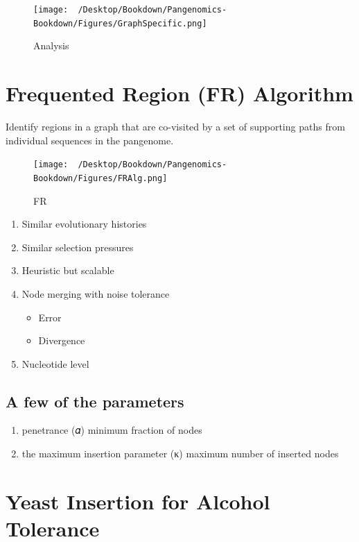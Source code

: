 \documentclass[
]{book}
\providecommand{\tightlist}{%
  \setlength{\itemsep}{0pt}\setlength{\parskip}{0pt}}
\begin{document}
\begin{figure}
\centering
\texttt{[image: ~/Desktop/Bookdown/Pangenomics-Bookdown/Figures/GraphSpecific.png]}
\caption{Analysis}
\end{figure}

\hypertarget{frequented-region-fr-algorithm}{%
\section{Frequented Region (FR) Algorithm}\label{frequented-region-fr-algorithm}}

Identify regions in a graph that are co-visited by a set of supporting
paths from individual sequences in the pangenome.

\begin{figure}
\centering
\texttt{[image: ~/Desktop/Bookdown/Pangenomics-Bookdown/Figures/FRAlg.png]}
\caption{FR}
\end{figure}

\begin{enumerate}
\def\labelenumi{\arabic{enumi}.}
\item
  Similar evolutionary histories
\item
  Similar selection pressures
\item
  Heuristic but scalable
\item
  Node merging with noise tolerance

  \begin{itemize}
  \tightlist
  \item
    Error
  \item
    Divergence
  \end{itemize}
\item
  Nucleotide level
\end{enumerate}

\hypertarget{a-few-of-the-parameters}{%
\subsection{A few of the parameters}\label{a-few-of-the-parameters}}

\begin{enumerate}
\def\labelenumi{\arabic{enumi}.}
\tightlist
\item
  penetrance (𝛼)
  minimum fraction of nodes
\item
  the maximum insertion parameter (κ)
  maximum number of inserted nodes
\end{enumerate}

\hypertarget{yeast-insertion-for-alcohol-tolerance}{%
\section{Yeast Insertion for Alcohol Tolerance}\label{yeast-insertion-for-alcohol-tolerance}}
\end{document}
